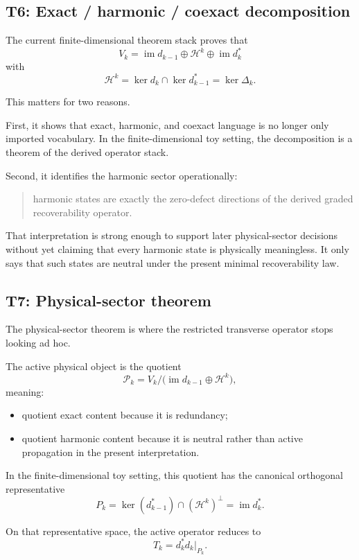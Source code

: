 \documentclass[11pt]{article}
\begin{document}
\subsection{T6: Exact / harmonic / coexact decomposition}

The current finite-dimensional theorem stack proves that
\[
V_k
=
\operatorname{im} d_{k-1}
\oplus
\mathcal H^k
\oplus
\operatorname{im} d_k^*
\]
with
\[
\mathcal H^k = \ker d_k \cap \ker d_{k-1}^* = \ker \Delta_k.
\]

This matters for two reasons.

First, it shows that exact, harmonic, and coexact language is no longer only imported vocabulary. In the finite-dimensional toy setting, the decomposition is a theorem of the derived operator stack.

Second, it identifies the harmonic sector operationally:
\begin{quote}
harmonic states are exactly the zero-defect directions of the derived graded recoverability operator.
\end{quote}

That interpretation is strong enough to support later physical-sector decisions without yet claiming that every harmonic state is physically meaningless. It only says that such states are neutral under the present minimal recoverability law.

\subsection{T7: Physical-sector theorem}

The physical-sector theorem is where the restricted transverse operator stops looking ad hoc.

The active physical object is the quotient
\[
\mathcal P_k
=
V_k / \bigl(\operatorname{im} d_{k-1}\oplus \mathcal H^k\bigr),
\]
meaning:
\begin{itemize}
\item quotient exact content because it is redundancy;
\item quotient harmonic content because it is neutral rather than active propagation in the present interpretation.
\end{itemize}

In the finite-dimensional toy setting, this quotient has the canonical orthogonal representative
\[
P_k
=
\ker(d_{k-1}^*) \cap (\mathcal H^k)^\perp
=
\operatorname{im} d_k^*.
\]

On that representative space, the active operator reduces to
\[
T_k
=
d_k^*d_k\big|_{P_k}.
\]
\end{document}
